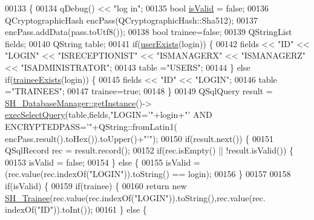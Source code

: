 \begin{DoxyCode}
00133 \{
00134     qDebug() << \textcolor{stringliteral}{"log in"};
00135     \textcolor{keywordtype}{bool} \hyperlink{classSH__User_a07de5c02b2a02b3bb2b0aaf0886bb4d9}{isValid} = \textcolor{keyword}{false};
00136     QCryptographicHash encPass(QCryptographicHash::Sha512);
00137     encPass.addData(pass.toUtf8());
00138     \textcolor{keywordtype}{bool} trainee=\textcolor{keyword}{false};
00139     QStringList fields;
00140     QString table;
00141     \textcolor{keywordflow}{if}(\hyperlink{classSH__User_a64161b35866b1c635d5f4214095a2b1e}{userExists}(login)) \{
00142         fields << \textcolor{stringliteral}{"ID"} << \textcolor{stringliteral}{"LOGIN"} << \textcolor{stringliteral}{"ISRECEPTIONIST"} << \textcolor{stringliteral}{"ISMANAGERX"} << \textcolor{stringliteral}{"ISMANAGERZ"} << \textcolor{stringliteral}{"ISADMINISTRATOR"};
00143         table =\textcolor{stringliteral}{"USERS"};
00144     \} \textcolor{keywordflow}{else} \textcolor{keywordflow}{if}(\hyperlink{classSH__User_adfc35c967cb405f4a14886676612fbb7}{traineeExists}(login)) \{
00145         fields << \textcolor{stringliteral}{"ID"} << \textcolor{stringliteral}{"LOGIN"};
00146         table =\textcolor{stringliteral}{"TRAINEES"};
00147         trainee=\textcolor{keyword}{true};
00148     \}
00149     QSqlQuery result = \hyperlink{classSH__DatabaseManager_a31198eb4de0f8b18e3fa0eed09f24d19}{SH\_DatabaseManager::getInstance}()->
      \hyperlink{classSH__DatabaseManager_ab8f9850cb68444ab9a4e613b36a3b044}{execSelectQuery}(table,fields,\textcolor{stringliteral}{"LOGIN='"}+login+\textcolor{stringliteral}{"' AND ENCRYPTEDPASS='"}+QString::fromLatin1(
      encPass.result().toHex()).toUpper()+\textcolor{stringliteral}{"'"});
00150     \textcolor{keywordflow}{if}(result.next()) \{
00151         QSqlRecord rec = result.record();
00152         \textcolor{keywordflow}{if}(rec.isEmpty() || !result.isValid()) \{
00153             isValid = \textcolor{keyword}{false};
00154         \} \textcolor{keywordflow}{else} \{
00155             isValid = (rec.value(rec.indexOf(\textcolor{stringliteral}{"LOGIN"})).toString() == login);
00156         \}
00157 
00158         \textcolor{keywordflow}{if}(isValid) \{
00159             \textcolor{keywordflow}{if}(trainee) \{
00160                 \textcolor{keywordflow}{return} \textcolor{keyword}{new} \hyperlink{classSH__Trainee}{SH\_Trainee}(rec.value(rec.indexOf(\textcolor{stringliteral}{"LOGIN"})).toString(),rec.value(rec.
      indexOf(\textcolor{stringliteral}{"ID"})).toInt());
00161             \} \textcolor{keywordflow}{else} \{

\end{DoxyCode}
